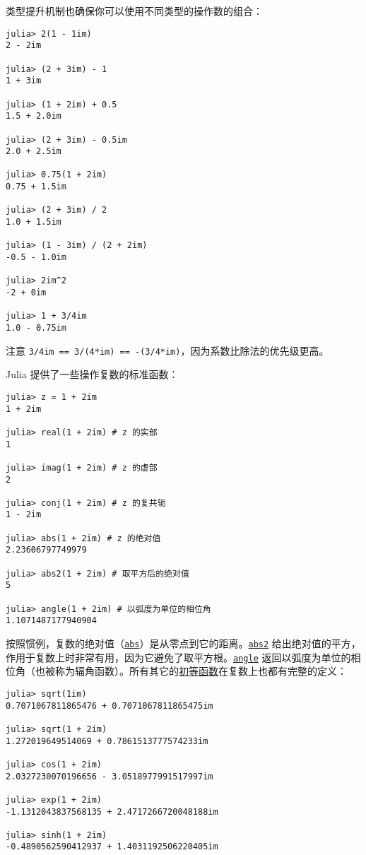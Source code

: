 类型提升机制也确保你可以使用不同类型的操作数的组合：




\begin{verbatim}
julia> 2(1 - 1im)
2 - 2im

julia> (2 + 3im) - 1
1 + 3im

julia> (1 + 2im) + 0.5
1.5 + 2.0im

julia> (2 + 3im) - 0.5im
2.0 + 2.5im

julia> 0.75(1 + 2im)
0.75 + 1.5im

julia> (2 + 3im) / 2
1.0 + 1.5im

julia> (1 - 3im) / (2 + 2im)
-0.5 - 1.0im

julia> 2im^2
-2 + 0im

julia> 1 + 3/4im
1.0 - 0.75im
\end{verbatim}



注意 \texttt{3/4im == 3/(4*im) == -(3/4*im)}，因为系数比除法的优先级更高。



Julia 提供了一些操作复数的标准函数：




\begin{verbatim}
julia> z = 1 + 2im
1 + 2im

julia> real(1 + 2im) # z 的实部
1

julia> imag(1 + 2im) # z 的虚部
2

julia> conj(1 + 2im) # z 的复共轭
1 - 2im

julia> abs(1 + 2im) # z 的绝对值
2.23606797749979

julia> abs2(1 + 2im) # 取平方后的绝对值
5

julia> angle(1 + 2im) # 以弧度为单位的相位角
1.1071487177940904
\end{verbatim}



按照惯例，复数的绝对值（\hyperlink{9614495866226399167}{\texttt{abs}}）是从零点到它的距离。\hyperlink{15686257922156163743}{\texttt{abs2}} 给出绝对值的平方，作用于复数上时非常有用，因为它避免了取平方根。\hyperlink{9465547375318501186}{\texttt{angle}} 返回以弧度为单位的相位角（也被称为辐角函数）。所有其它的\hyperlink{7194628046456539104}{初等函数}在复数上也都有完整的定义：




\begin{verbatim}
julia> sqrt(1im)
0.7071067811865476 + 0.7071067811865475im

julia> sqrt(1 + 2im)
1.272019649514069 + 0.7861513777574233im

julia> cos(1 + 2im)
2.0327230070196656 - 3.0518977991517997im

julia> exp(1 + 2im)
-1.1312043837568135 + 2.4717266720048188im

julia> sinh(1 + 2im)
-0.4890562590412937 + 1.4031192506220405im
\end{verbatim}




